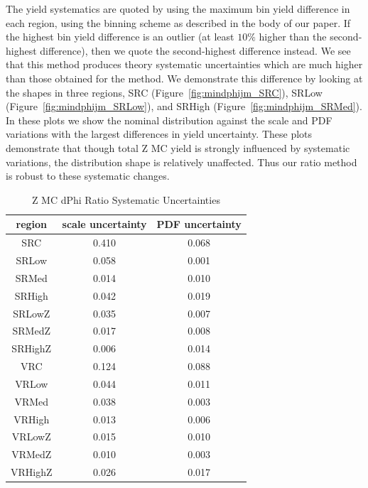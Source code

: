 The yield systematics are quoted by using the maximum \mll bin yield difference in each region, using the binning scheme as described in the body of our paper. If the highest bin yield difference is an outlier (at least $10\%$ higher than the second-highest difference), then we quote the second-highest difference instead. We see that this method produces theory systematic uncertainties which are much higher than those obtained for the \mindphijm method. We demonstrate this difference by looking at the \mindphijm shapes in three regions, SRC (Figure~\ref{fig:mindphijm_SRC}), SRLow (Figure~\ref{fig:mindphijm_SRLow}), and SRHigh (Figure~\ref{fig:mindphijm_SRMed}). In these plots we show the nominal \mindphijm distribution against the scale and PDF variations with the largest differences in yield uncertainty. These plots demonstrate that though total Z MC yield is strongly influenced by systematic variations, the \mindphijm distribution shape is relatively unaffected. Thus our \mindphijm ratio method is robust to these systematic changes.

\begin{table}
\caption{Z MC dPhi Ratio Systematic Uncertainties}
\begin{center}
\begin{tabular}{c|c|c}
region & scale uncertainty & PDF uncertainty \\
\hline
SRC & 0.410 & 0.068 \\
SRLow & 0.058 & 0.001 \\
SRMed & 0.014 & 0.010 \\
SRHigh & 0.042 & 0.019 \\
SRLowZ & 0.035 & 0.007 \\
SRMedZ & 0.017 & 0.008 \\
SRHighZ & 0.006 & 0.014 \\
VRC & 0.124 & 0.088 \\
VRLow & 0.044 & 0.011 \\
VRMed & 0.038 & 0.003 \\
VRHigh & 0.013 & 0.006 \\
VRLowZ & 0.015 & 0.010 \\
VRMedZ & 0.010 & 0.003 \\
VRHighZ & 0.026 & 0.017 \\
\end{tabular}
\end{center}
\label{tab:ZMC_ratio_systematics_rep} 
\end{table}

